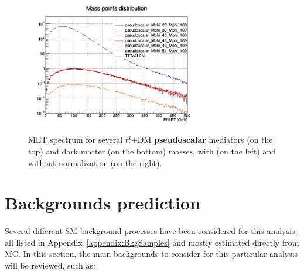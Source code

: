 \documentclass[a4paper, 10pt, openright]{report}
\begin{document}
\begin{figure}[htbp]
{\begin{minipage}[b]{.49\textwidth}
\includegraphics[width=8cm, height=6cm]{figs/pseudoscalarMETmChiLarge.png}
\end{minipage} \hfill
}
\caption{\ac{MET} spectrum for several $t \bar t$+DM \textbf{pseudoscalar} mediators (on the top) and dark matter (on the bottom) masses, with (on the left) and without normalization (on the right).}
\label{fig:signalPseudoscalar}
\end{figure}

\section{Backgrounds prediction} \label{section:Backgrounds}

Several different \ac{SM} background processes have been considered for this analysis, all listed in Appendix~\ref{appendix:BkgSamples} and mostly estimated directly from \ac{MC}. In this section, the main backgrounds to consider for this particular analysis will be reviewed, such as:
\end{document}
